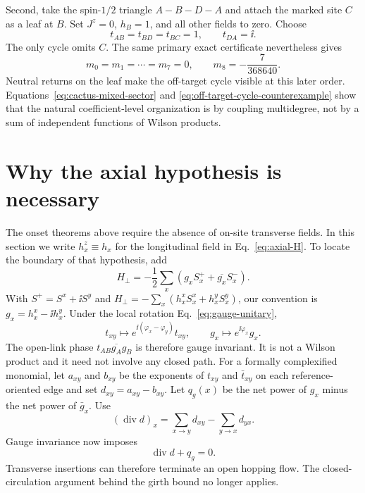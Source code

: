 Second, take the spin-$1/2$ triangle $A\!-\!B\!-\!D\!-\!A$ and attach the
marked site $C$ as a leaf at $B$.  Set $J^z=0$, $h_B=1$, and all other fields
to zero.  Choose
\begin{equation}
 t_{AB}=t_{BD}=t_{BC}=1,
 \qquad
 t_{DA}=\ii.
\end{equation}
The only cycle omits $C$.  The same primary exact certificate nevertheless
gives
\begin{equation}
 m_0=m_1=\cdots=m_7=0,
 \qquad
 m_8=-\frac7{368640}.
 \label{eq:off-target-cycle-counterexample}
\end{equation}
Neutral returns on the leaf make the off-target cycle visible at this later
order.  Equations~\eqref{eq:cactus-mixed-sector} and
\eqref{eq:off-target-cycle-counterexample} show that the natural
coefficient-level organization is by coupling multidegree, not by a sum of
independent functions of Wilson products.


\section{Why the axial hypothesis is necessary}
\label{sec:axial-boundary}

The onset theorems above require the absence of on-site transverse fields.
In this section we write $h_x^z\equiv h_x$ for the longitudinal field in
Eq.~\eqref{eq:axial-H}.  To locate the boundary of that hypothesis, add
\begin{equation}
 H_\perp=-\frac12\sum_x
 \left(g_xS_x^++\overline{g_x}S_x^-\right).
 \label{eq:transverse-field-H}
\end{equation}
With $S^+=S^x+\ii S^y$ and
$H_\perp=-\sum_x(h_x^xS_x^x+h_x^yS_x^y)$, our convention is
$g_x=h_x^x-\ii h_x^y$.  Under the local rotation
Eq.~\eqref{eq:gauge-unitary},
\begin{equation}
 t_{xy}\longmapsto
 e^{\ii(\varphi_x-\varphi_y)}t_{xy},
 \qquad
 g_x\longmapsto e^{\ii\varphi_x}g_x.
 \label{eq:transverse-gauge-action}
\end{equation}
The open-link phase $t_{AB}\overline{g_A}g_B$ is therefore gauge invariant.
It is not a Wilson product and it need not involve any closed path.
For a formally complexified monomial, let $a_{xy}$ and $b_{xy}$ be the
exponents of $t_{xy}$ and $\bar t_{xy}$ on each reference-oriented edge and
set $d_{xy}=a_{xy}-b_{xy}$.  Let $q_g(x)$ be the net power of $g_x$ minus
the net power of $\bar g_x$.  Use
\begin{equation*}
 (\operatorname{div}d)_x
 =\sum_{x\to y}d_{xy}-\sum_{y\to x}d_{yx}.
\end{equation*}
Gauge invariance now imposes
\begin{equation}
 \operatorname{div}d+q_g=0.
 \label{eq:transverse-flow-balance}
\end{equation}
Transverse insertions can therefore terminate an open hopping flow.  The
closed-circulation argument behind the girth bound no longer applies.

